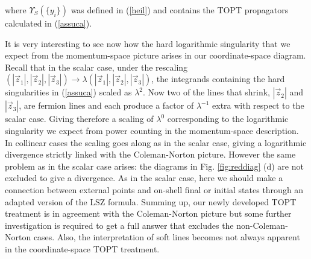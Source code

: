 \documentclass[%
 reprint,
 amsmath,amssymb,
 aps,
]{revtex4-1}
\begin{document}
 where $\varUpsilon_S(\{y_i\})$ was defined in (\ref{heil}) and contains the TOPT propagators calculated in (\ref{assuca}).\par
 It is very interesting to see now how the hard logarithmic singularity that we expect from the momentum-space picture arises in our coordinate-space diagram. Recall that in the scalar case, under the rescaling $(|\vec{z}_1|,|\vec{z}_2|,|\vec{z}_3|)\to\lambda(|\vec{z}_1|,|\vec{z}_2|,|\vec{z}_3|)$, the integrands containing the hard singularities in (\ref{assuca}) scaled as $\lambda^2$. Now two of the lines that shrink, $|\vec{z}_2|$ and $|\vec{z}_3|$, are fermion lines and each produce a factor of $\lambda^{-1}$ extra with respect to the scalar case. Giving therefore a scaling of $\lambda^0$ corresponding to the logarithmic singularity we expect from power counting in the momentum-space description. In collinear cases the scaling goes along as in the scalar case, giving a logarithmic divergence strictly linked with the Coleman-Norton picture. However the same problem as in the scalar case arises: the diagrams in Fig. \ref{fig:reddiag} (d) are not excluded to give a divergence. As in the scalar case, here we should make a connection between external points and on-shell final or initial states through an adapted version of the LSZ formula. Summing up, our newly developed TOPT treatment is in agreement with the Coleman-Norton picture but some further investigation is required to get a full answer that excludes the non-Coleman-Norton cases. Also, the interpretation of soft lines becomes not always apparent in the coordinate-space TOPT treatment.
\end{document}
